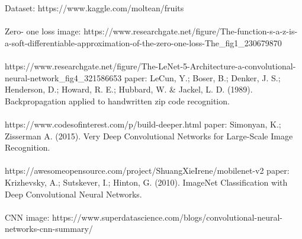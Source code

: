 \documentclass[10pt,english, openany]{book}
\begin{document}
Dataset: https://www.kaggle.com/moltean/fruits \\ \\
Zero- one loss image: https://www.researchgate.net/figure/The-function-s-a-z-is-a-soft-differentiable-approximation-of-the-zero-one-loss-The\_fig1\_230679870 \\ \\
https://www.researchgate.net/figure/The-LeNet-5-Architecture-a-convolutional-neural-network\_fig4\_321586653
       paper: LeCun, Y.; Boser, B.; Denker, J. S.; Henderson, D.; Howard, R. E.; Hubbard, W. \& Jackel, L. D. (1989). Backpropagation applied to handwritten zip code recognition.
\\ \\
https://www.codesofinterest.com/p/build-deeper.html
     paper: Simonyan, K.; Zisserman A. (2015).  Very Deep Convolutional Networks for Large-Scale Image Recognition. 
\\\\
https://awesomeopensource.com/project/ShuangXieIrene/mobilenet-v2
	 paper: Krizhevsky, A.; Sutskever, I.; Hinton, G. (2010). ImageNet Classification with Deep Convolutional Neural Networks.
\\\\
CNN image: https://www.superdatascience.com/blogs/convolutional-neural-networks-cnn-summary/
\end{document}
